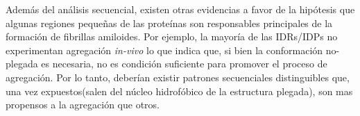 
Además del análisis secuencial, existen otras evidencias a favor de la hipótesis que algunas regiones pequeñas de las proteínas son responsables principales de la formación de fibrillas amiloides. 
Por ejemplo, la mayoría de las IDRs/IDPs no experimentan agregación \textit{in-vivo}\cite{linding2004comparative} lo que indica que, si bien la conformación no-plegada es necesaria, no es condición suficiente 
para promover el proceso de agregación.
Por lo tanto, deberían existir patrones secuenciales distinguibles que, una vez expuestos(salen del núcleo hidrofóbico de la estructura plegada), son mas propensos a la agregación que otros.  


% 


